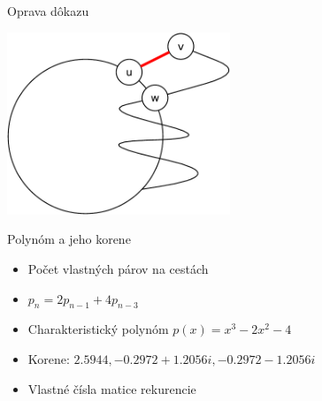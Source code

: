 \documentclass[slovak]{beamer}
\begin{document}
\begin{frame}{Oprava dôkazu}
    \begin{center}
        \includegraphics[width=0.5\textwidth]{grafy/posledny_krok.pdf}
    \end{center}
\end{frame}

\begin{frame}{Polynóm a jeho korene}
    \begin{itemize}
        \item Počet vlastných párov na cestách
        \item $p_n = 2p_{n-1} + 4p_{n-3}$
        \item Charakteristický polynóm $p(x) = x^3 - 2x^2 - 4$
        \item Korene: $2.5944, -0.2972 + 1.2056i, -0.2972 - 1.2056i$
        \item Vlastné čísla matice rekurencie
    \end{itemize}
\end{frame}
\end{document}
